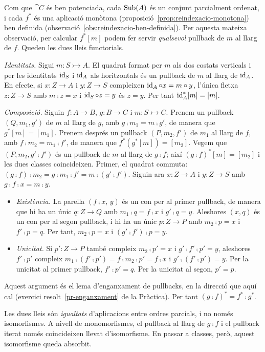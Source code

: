 \begin{prova}
Com que $\cat{C}$ és ben potenciada, cada $\operatorname{Sub}(A)$ és un conjunt parcialment ordenat, i cada $f^{*}$ és una aplicació monòtona (proposició~\ref{prop:reindexacio-monotona}) ben definida (observació~\ref{obs:reindexacio-ben-definida}). Per aquesta mateixa observació, per calcular $f^{*}[m]$ podem fer servir \emph{qualsevol} pullback de $m$ al llarg de $f$. Queden les dues lleis functorials.

\emph{Identitats.} Sigui $m\colon S\rightarrowtail A$. El quadrat format per $m$ als dos costats verticals i per les identitats $\operatorname{id}_S$ i $\operatorname{id}_A$ als horitzontals és un pullback de $m$ al llarg de $\operatorname{id}_A$. En efecte, si $x\colon Z\to A$ i $y\colon Z\to S$ compleixen $\operatorname{id}_A\circ x=m\circ y$, l'única fletxa $z\colon Z\to S$ amb $m\comp z=x$ i $\operatorname{id}_S\circ z=y$ és $z=y$. Per tant $\operatorname{id}_A^{*}[m]=[m]$.

\emph{Composició.} Siguin $f\colon A\to B$, $g\colon B\to C$ i $m\colon S\rightarrowtail C$. Prenem un pullback $(Q,m_1,g')$ de $m$ al llarg de $g$, amb $g\comp m_1=m\comp g'$, de manera que $g^{*}[m]=[m_1]$. Prenem després un pullback $(P,m_2,f')$ de $m_1$ al llarg de $f$, amb $f\comp m_2=m_1\comp f'$, de manera que $f^{*}(g^{*}[m])=[m_2]$. Vegem que $(P,m_2,g'\comp f')$ és un pullback de $m$ al llarg de $g\comp f$; així $(g\comp f)^{*}[m]=[m_2]$ i les dues classes coincideixen. Primer, el quadrat commuta: $(g\comp f)\comp m_2=g\comp m_1\comp f'=m\comp(g'\comp f')$. Siguin ara $x\colon Z\to A$ i $y\colon Z\to S$ amb $g\comp f\comp x=m\comp y$.
\begin{itemize}
\item \emph{Existència.} La parella $(f\comp x,\,y)$ és un con per al primer pullback, de manera que hi ha un únic $q\colon Z\to Q$ amb $m_1\comp q=f\comp x$ i $g'\comp q=y$. Aleshores $(x,q)$ és un con per al segon pullback, i hi ha un únic $p\colon Z\to P$ amb $m_2\comp p=x$ i $f'\comp p=q$. Per tant, $m_2\comp p=x$ i $(g'\comp f')\comp p=y$.
\item \emph{Unicitat.} Si $p'\colon Z\to P$ també compleix $m_2\comp p'=x$ i $g'\comp f'\comp p'=y$, aleshores $f'\comp p'$ compleix $m_1\comp(f'\comp p')=f\comp m_2\comp p'=f\comp x$ i $g'\comp(f'\comp p')=y$. Per la unicitat al primer pullback, $f'\comp p'=q$. Per la unicitat al segon, $p'=p$.
\end{itemize}
Aquest argument és el lema d'enganxament de pullbacks, en la direcció que aquí cal (exercici resolt~\ref{pr-enganxament} de la Pràctica). Per tant $(g\comp f)^{*}=f^{*}\comp g^{*}$.

Les dues lleis són \emph{igualtats} d'aplicacions entre ordres parcials, i no només isomorfismes. A nivell de monomorfismes, el pullback al llarg de $g\comp f$ i el pullback iterat només coincideixen llevat d'isomorfisme. En passar a classes, però, aquest isomorfisme queda absorbit.
\end{prova}

